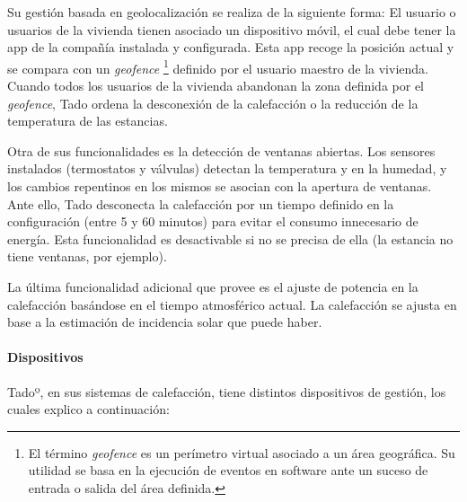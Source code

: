 \documentclass[spanish,12pt, a4paper, twoside]{paper}
\begin{document}
Su gestión basada en geolocalización se realiza de la siguiente forma: El usuario o usuarios de la vivienda tienen asociado un dispositivo móvil, el cual debe tener la app de la compañía instalada y configurada. Esta app recoge la posición actual y se compara con un \emph{geofence} \footnote{El término \emph{geofence} es un perímetro virtual asociado a un área geográfica. Su utilidad se basa en la ejecución de eventos en software ante un suceso de entrada o salida del área definida. } definido por el usuario maestro de la vivienda. Cuando todos los usuarios de la vivienda abandonan la zona definida por el \emph{geofence}, Tado ordena la desconexión de la calefacción o la reducción de la temperatura de las estancias.
\newline

Otra de sus funcionalidades es la detección de ventanas abiertas. Los sensores instalados (termostatos y válvulas) detectan la temperatura y en la humedad, y los cambios repentinos en los mismos se asocian con la apertura de ventanas. Ante ello, Tado desconecta la calefacción por un tiempo definido en la configuración (entre 5 y 60 minutos) para evitar el consumo innecesario de energía. Esta funcionalidad es desactivable si no se precisa de ella (la estancia no tiene ventanas, por ejemplo).
\newline

La última funcionalidad adicional que provee es el ajuste de potencia en la calefacción basándose en el tiempo atmosférico actual. La calefacción se ajusta en base a la estimación de incidencia solar que puede haber.

\paragraph{Dispositivos}

Tadoº, en sus sistemas de calefacción, tiene distintos dispositivos de gestión, los cuales explico a continuación:
\end{document}
